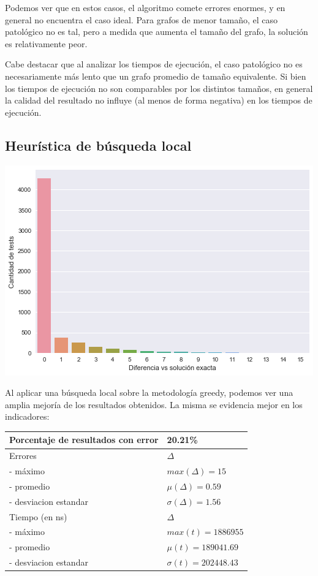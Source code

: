 Podemos ver que en estos casos, el algoritmo comete errores enormes, y en general no encuentra el caso ideal. Para grafos de menor tamaño, el caso patológico no es tal, pero a medida que aumenta el tamaño del grafo, la solución es relativamente peor.

Cabe destacar que al analizar los tiempos de ejecución, el caso patológico no es necesariamente más lento que un grafo promedio de tamaño equivalente. Si bien los tiempos de ejecución no son comparables por los distintos tamaños, en general la calidad del resultado no influye (al menos de forma negativa) en los tiempos de ejecución. 

\subsection*{Heurística de búsqueda local}

\begin{center}
    \includegraphics[scale=0.6]{img/accuracy-local.png}
\end{center}

Al aplicar una búsqueda local sobre la metodología greedy, podemos ver una amplia mejoría de los resultados obtenidos. La misma se evidencia mejor en los indicadores:

\begin{center}
    \begin{tabular}{ | l l |}
        \hline
        Porcentaje de resultados con error & 20.21\% \\ \hline
        Errores & $\Delta$ \\
        - máximo & $max(\Delta) = 15$ \\
        - promedio & $\mu(\Delta) = 0.59$ \\
        - desviacion estandar & $\sigma(\Delta) = 1.56$ \\ \hline
        Tiempo (en ns) & $\Delta$ \\
        - máximo & $max(t) = 1886955 $ \\
        - promedio & $\mu(t) = 189041.69$ \\
        - desviacion estandar & $\sigma(t) = 202448.43$ \\
        \hline
    \end{tabular}
\end{center}

